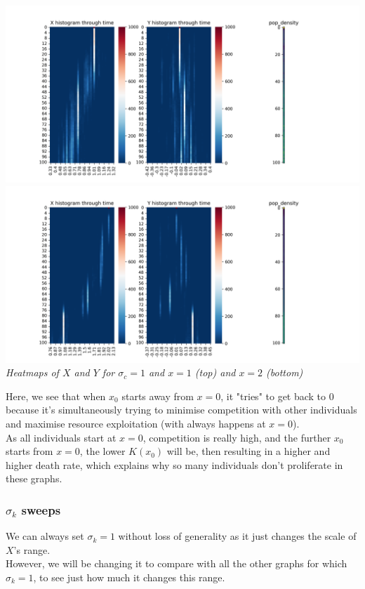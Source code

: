 \documentclass{article}
\begin{document}
\begin{center}
\includegraphics[scale=0.37]{x0_sc_sweep_(1.0)_(1)}
\includegraphics[scale=0.37]{x0_sc_sweep_(2.0)_(1)} \\
\textit{Heatmaps of $X$ and $Y$ for $\sigma_c=1$ and $x=1$ (top) and $x=2$ (bottom)}
\end{center}

Here, we see that when $x_0$ starts away from $x=0$, it "tries" to get back to $0$ because it's simultaneously trying to minimise competition with other individuals and maximise resource exploitation (with always happens at $x=0$). \\
As all individuals start at $x=0$, competition is really high, and the further $x_0$ starts from $x=0$, the lower $K(x_0)$ will be, then resulting in a higher and higher death rate, which explains why so many individuals don't proliferate in these graphs. \\
\vspace{5mm}


\subsubsection{$\sigma_k$ sweeps}

We can always set $\sigma_k = 1$ without loss of generality as it just changes the scale of $X$'s range. \\
However, we will be changing it to compare with all the other graphs for which $\sigma_k = 1$, to see just how much it changes this range. \\
\vspace{5mm}
\end{document}
